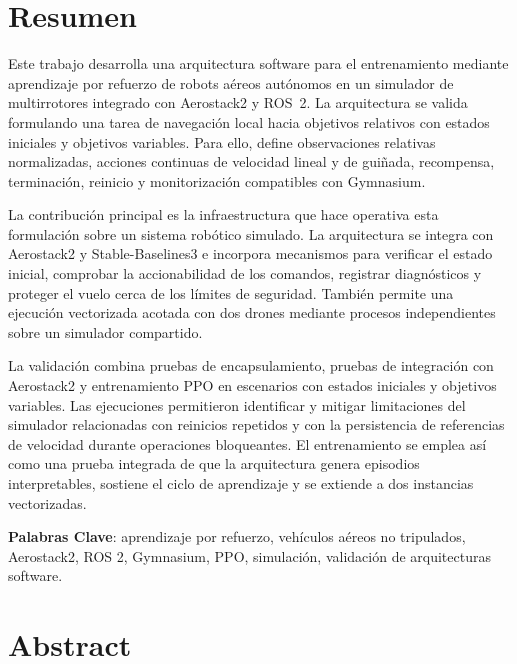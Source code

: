 \chapter*{Resumen} \label{chp:abstract}

Este trabajo desarrolla una arquitectura software para el entrenamiento mediante
aprendizaje por refuerzo de robots aéreos autónomos en un simulador de
multirrotores integrado con Aerostack2 y ROS~2. La arquitectura se valida formulando una tarea de
navegación local hacia objetivos relativos con estados iniciales y objetivos
variables. Para ello, define observaciones relativas normalizadas, acciones
continuas de velocidad lineal y de guiñada, recompensa, terminación, reinicio y
monitorización compatibles con Gymnasium.

La contribución principal es la infraestructura que hace operativa esta
formulación sobre un sistema robótico simulado. La arquitectura se integra con
Aerostack2 y Stable-Baselines3 e incorpora mecanismos para verificar el estado
inicial, comprobar la accionabilidad de los comandos, registrar diagnósticos y
proteger el vuelo cerca de los límites de seguridad. También permite una
ejecución vectorizada acotada con dos drones mediante procesos independientes
sobre un simulador compartido.

La validación combina pruebas de encapsulamiento, pruebas de integración con
Aerostack2 y entrenamiento PPO en escenarios con estados iniciales y objetivos
variables. Las ejecuciones permitieron identificar y mitigar limitaciones del
simulador relacionadas con reinicios repetidos y con la persistencia de
referencias de velocidad durante operaciones bloqueantes. El entrenamiento se
emplea así como una prueba integrada de que la arquitectura genera episodios
interpretables, sostiene el ciclo de aprendizaje y se extiende a dos instancias
vectorizadas.

\textbf{Palabras Clave}: aprendizaje por refuerzo, vehículos aéreos no
tripulados, Aerostack2, ROS 2, Gymnasium, PPO, simulación, validación de
arquitecturas software.


\newpage


\chapter*{Abstract}


